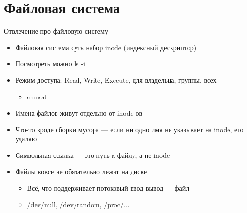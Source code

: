 \documentclass{../../slides-style}
\begin{document}
    
    \begin{frame}[plain]
        \titlepage
    \end{frame}

    \section{Файловая система}

    \begin{frame}{Отвлечение про файловую систему}
        \begin{itemize}
            \item Файловая система суть набор inode (индексный дескриптор)
            \item Посмотреть можно ls -i
            \item Режим доступа: Read, Write, Execute, для владельца, группы, всех
            \begin{itemize}
                \item chmod
            \end{itemize}
            \item Имена файлов живут отдельно от inode-ов
            \item Что-то вроде сборки мусора --- если ни одно имя не указывает на inode, его удаляют
            \item Символьная ссылка --- это путь к файлу, а не inode
            \item Файлы вовсе не обязательно лежат на диске
            \begin{itemize}
                \item Всё, что поддерживает потоковый ввод-вывод --- файл!
                \item /dev/null, /dev/random, /proc/...
            \end{itemize}
        \end{itemize}
    \end{frame}
\end{document}
